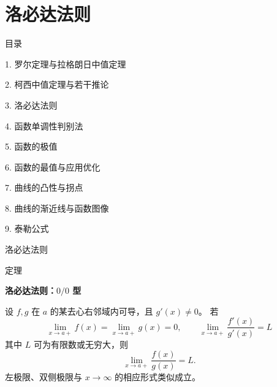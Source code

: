 \documentclass[aspectratio=169,10pt,fontset=fandol]{ctexbeamer}
\begin{document}
\section{洛必达法则}
\begin{frame}[t,fragile]{目录}
\normalsize
{\color{black}\normalsize 1. 罗尔定理与拉格朗日中值定理\par}\vspace{0.22em}
{\color{black}\normalsize 2. 柯西中值定理与若干推论\par}\vspace{0.22em}
{\color{blue}\normalsize 3. 洛必达法则\par}\vspace{0.22em}
{\color{gray!40}\normalsize 4. 函数单调性判别法\par}\vspace{0.22em}
{\color{gray!40}\normalsize 5. 函数的极值\par}\vspace{0.22em}
{\color{gray!40}\normalsize 6. 函数的最值与应用优化\par}\vspace{0.22em}
{\color{gray!40}\normalsize 7. 曲线的凸性与拐点\par}\vspace{0.22em}
{\color{gray!40}\normalsize 8. 曲线的渐近线与函数图像\par}\vspace{0.22em}
{\color{gray!40}\normalsize 9. 泰勒公式\par}\vspace{0.22em}
\end{frame}
\begin{frame}[t,fragile]{洛必达法则}
\footnotesize
\begin{block}{定理}
{\footnotesize
\textbf{洛必达法则：$0/0$ 型}\par

设 $f,g$ 在 $a$ 的某去心右邻域内可导，且 $g'(x)\neq0$。 若
\[
\lim_{x\to a+}f(x)=\lim_{x\to a+}g(x)=0,\qquad
\lim_{x\to a+}\frac{f'(x)}{g'(x)}=L
\]
其中 $L$ 可为有限数或无穷大，则
\[
\lim_{x\to a+}\frac{f(x)}{g(x)}=L.
\]
左极限、双侧极限与 $x\to\infty$ 的相应形式类似成立。

}
\end{block}
\end{frame}
\end{document}
